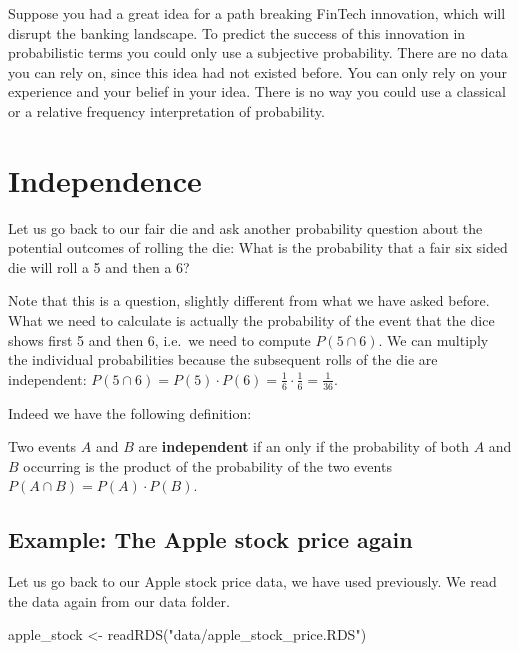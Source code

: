 \documentclass[
]{book}
\newenvironment{Shaded}{\begin{snugshade}}{\end{snugshade}}
\newcommand{\FunctionTok}[1]{\textcolor[rgb]{0.00,0.00,0.00}{#1}}
\newcommand{\NormalTok}[1]{#1}
\newcommand{\OtherTok}[1]{\textcolor[rgb]{0.56,0.35,0.01}{#1}}
\newcommand{\StringTok}[1]{\textcolor[rgb]{0.31,0.60,0.02}{#1}}
\providecommand{\tightlist}{%
  \setlength{\itemsep}{0pt}\setlength{\parskip}{0pt}}
\begin{document}
Suppose you had a great idea for a path breaking FinTech innovation, which will disrupt
the banking landscape. To predict the success of this innovation in probabilistic terms
you could only use a subjective probability. There are no data you can rely on, since this
idea had not existed before. You can only rely on your experience and your belief in
your idea. There is no way you could use a classical or a relative frequency
interpretation of probability.

\hypertarget{independence}{%
\section{Independence}\label{independence}}

Let us go back to our fair die and ask another probability question about the
potential outcomes of rolling the die: What is the probability that a fair six sided die
will roll a 5 and then a 6?

Note that this is a question, slightly different from what
we have asked before. What we need to calculate is actually the probability of
the event that the dice shows first 5 and then 6, i.e.~we need to compute
\(P(5 \cap 6)\). We can multiply the individual probabilities because the subsequent rolls of
the die are independent:
\(P(5 \cap 6) = P(5) \cdot P(6) = \frac{1}{6} \cdot \frac{1}{6} = \frac{1}{36}\).

Indeed we have the following definition:

\begin{description}
\tightlist
\item[Independence]
Two events \(A\) and \(B\) are \textbf{independent} if an only if the probability of
both \(A\) and \(B\) occurring is the product of the probability of the two events
\(P(A \cap B) = P(A) \cdot P(B)\).
\end{description}

\hypertarget{example-the-apple-stock-price-again}{%
\subsection{Example: The Apple stock price again}\label{example-the-apple-stock-price-again}}

Let us go back to our Apple stock price data, we have used previously. We read the
data again from our data folder.

\begin{Shaded}
\begin{Highlighting}[]
\NormalTok{apple\_stock }\OtherTok{\textless{}{-}} \FunctionTok{readRDS}\NormalTok{(}\StringTok{"data/apple\_stock\_price.RDS"}\NormalTok{)}
\end{Highlighting}
\end{Shaded}
\end{document}
